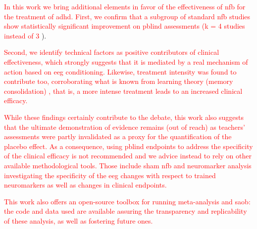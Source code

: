 \textcolor{red}{In this work we bring additional elements in favor of the effectiveness of \gls{nfb} for the treatment of \gls{adhd}. First, 
we confirm that a subgroup of standard \gls{nfb} studies show statistically significant improvement on \gls{pblind} 
assessments (k = 4 studies instead of 3 }\citet{Cortese2016}). 

\textcolor{red}{Second, we identify technical factors as positive contributors of clinical effectiveness, which strongly suggests 
that it is mediated by a real mechanism of action based on \gls{eeg} conditioning. Likewise, treatment intensity was found to 
contribute too, corroborating what is known from learning theory (memory consolidation)} \citep{Mowrer1960}\textcolor{red}{, that is, a more intense treatment leads to 
an increased clinical efficacy.}

\textcolor{red}{While these findings certainly contribute to the debate, this work also suggests that the ultimate demonstration of evidence 
remains (out of reach) as teachers’ assessments were partly invalidated as a proxy for the quantification of the placebo effect. 
As a consequence, using \gls{pblind} endpoints to address the specificity of the clinical efficacy is not recommended 
and we advice instead to rely on other available methodological tools. Those include sham \gls{nfb} and neuromarker 
analysis investigating the specificity of the \gls{eeg} changes with respect to trained neuromarkers as well as changes 
in clinical endpoints.}

\textcolor{red}{This work also offers an open-source toolbox for running meta-analysis and \gls{saob}: the code and data used are available 
assuring the transparency and replicability of these analysis, as well as fostering future ones.}

